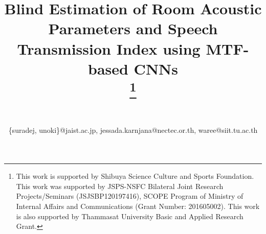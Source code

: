 \documentclass[conference]{IEEEtran}
\begin{document}
	
	\title{Blind Estimation of Room Acoustic Parameters and Speech Transmission Index using MTF-based CNNs\\
		\thanks{This work is supported by Shibuya Science Culture and Sports Foundation. This work was supported by JSPS-NSFC
			Bilateral Joint Research Projects/Seminars
			(JSJSBP120197416), SCOPE Program of Ministry of Internal Affairs and Communications (Grant Number: 201605002). This work is also supported by Thammasat University Basic and Applied Research Grant.}
	}
	
	\author{
		\\
		
		
		
		
		\{suradej, unoki\}@jaist.ac.jp, jessada.karnjana@nectec.or.th, waree@siit.tu.ac.th
	}
	\maketitle
	
\end{document}
